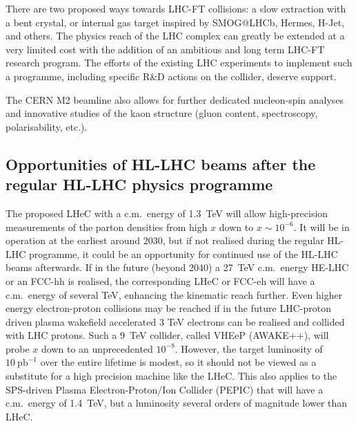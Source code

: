 There are two proposed ways towards LHC-FT collisions: a slow extraction with a
bent crystal, or internal gas target inspired by SMOG@LHCb, Hermes, H-Jet,
and others. The physics reach of the LHC complex can greatly be extended at a
very limited cost with the addition of an ambitious and long term LHC-FT
research program. The efforts of the existing LHC
experiments to implement such a programme, including specific R\&D actions on the
collider, deserve support.

The CERN M2 beamline also allows for further dedicated nucleon-spin analyses
and innovative studies of the kaon structure (gluon content, spectroscopy,
polarisability, etc.).

\subsection{Opportunities of HL-LHC beams after the regular HL-LHC physics
programme}


The proposed LHeC
with a c.m.\ energy of 1.3~TeV will allow
high-precision measurements of the parton densities from high $x$ down to $x
\sim 10^{-6}$. It will be in operation at the earliest around 2030, but if not
realised during the regular HL-LHC programme, it could be an opportunity for
continued use of the HL-LHC beams afterwards. If in the future (beyond 2040) a
27~TeV c.m.\ energy HE-LHC
or an FCC-hh is realised, the corresponding
LHeC or FCC-eh
will have a c.m.\ energy of several TeV, enhancing
the kinematic reach further. Even higher energy electron-proton collisions may
be reached if in the future LHC-proton driven plasma wakefield accelerated 3
TeV electrons can be realised and collided with LHC protons. Such a 9~TeV
collider, called VHEeP (AWAKE++),
will probe $x$ down to an
unprecedented $10^{-8}$. However, the target luminosity of
$10~\mathrm{pb^{-1}}$ over the entire lifetime is modest, so it should not be
viewed as a substitute for a high precision machine like the LHeC. This also
applies to the SPS-driven Plasma Electron-Proton/Ion Collider (PEPIC) 
that will have a c.m.\ energy of 1.4~TeV, but a luminosity several orders of
magnitude lower than LHeC.

